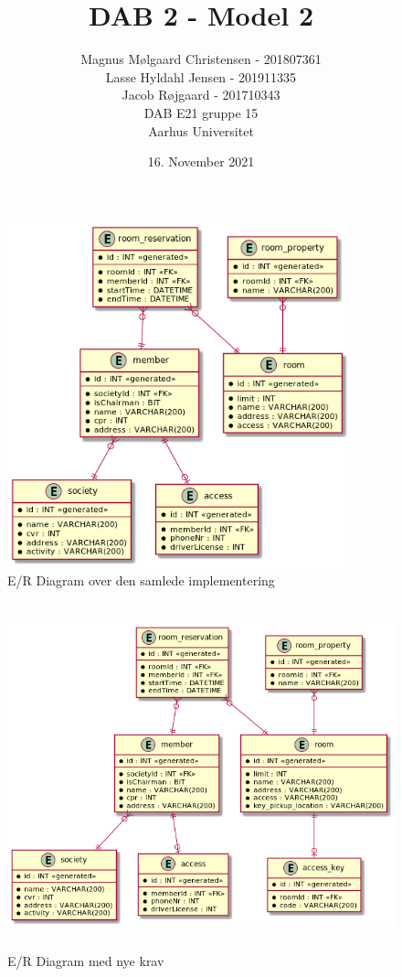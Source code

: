 \usepackage{wasysym}\usepackage{graphicx}\documentclass{article}
\title{DAB 2 - Model 2}
\author{
    Magnus Mølgaard Christensen - 201807361
    \\Lasse Hyldahl Jensen - 201911335
    \\Jacob Røjgaard - 201710343
    \\DAB E21 gruppe 15
    \\Aarhus Universitet}
\date{16. November 2021}
\begin{document}
    \maketitle
    \newpage
    \begin{figure}[H]
        \centering
        \includegraphics[height=10cm]{./er-diagram.png}
        \caption{E/R Diagram over den samlede implementering}
    \end{figure}
    
    \begin{figure}[H]
        \centering
        \includegraphics[height=10cm]{./er-diagram-with-migrations.png}
        \caption{E/R Diagram med nye krav}
    \end{figure}
    
\end{document}
